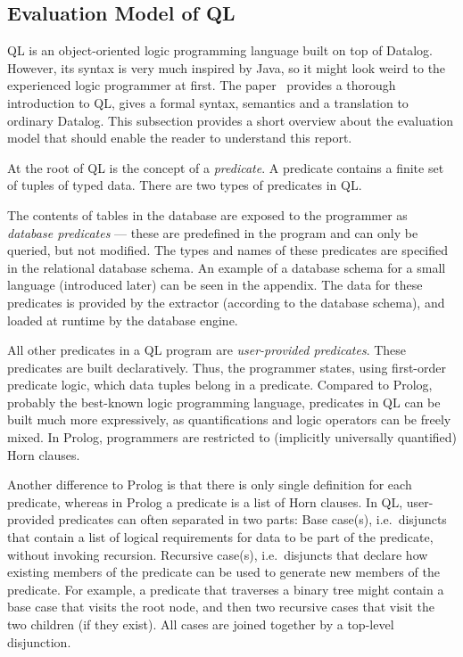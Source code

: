 \subsection{Evaluation Model of QL}
QL is an object-oriented logic programming language built on top of Datalog.
However, its syntax is very much inspired by Java, so it might look weird to the 
experienced logic programmer at first.
The paper~\cite{qlpaper} provides a thorough introduction to QL, gives a 
formal syntax, semantics and a translation to ordinary Datalog.
This subsection provides a short overview about the evaluation model that should
enable the reader to understand this report.

At the root of QL is the concept of a \emph{predicate}.
A predicate contains a finite set of tuples of typed data.
There are two types of predicates in QL.

The contents of tables in the database are exposed to the programmer as \emph{database 
predicates} --- these are predefined in the program and can only be queried, but not modified.
The types and names of these predicates are specified in the relational database schema.
An example of a database schema for a small language (introduced later) can be 
seen in the appendix.
The data for these predicates is provided by the extractor (according to the database schema),
and loaded at runtime by the database engine.

All other predicates in a QL program are \emph{user-provided predicates}.
These predicates are built declaratively.
Thus, the programmer states, using first-order predicate logic,
which data tuples belong in a predicate.
Compared to Prolog, probably the best-known logic programming language,
predicates in QL can be built much more expressively,
as quantifications and logic operators can be freely mixed.
In Prolog, programmers are restricted to (implicitly universally quantified) Horn clauses.

Another difference to Prolog is that there is only single definition for each predicate,
whereas in Prolog a predicate is a list of Horn clauses.
In QL, user-provided predicates can often separated in two parts:
Base case(s), i.e.\ disjuncts that contain a list of logical requirements for data 
to be part of the predicate, without invoking recursion.
Recursive case(s), i.e.\ disjuncts that declare how existing members of the predicate 
can be used to generate new members of the predicate.
For example, a predicate that traverses a binary tree might contain a base case that visits 
the root node, and then two recursive cases that visit the two children (if they exist).
All cases are joined together by a top-level disjunction.

